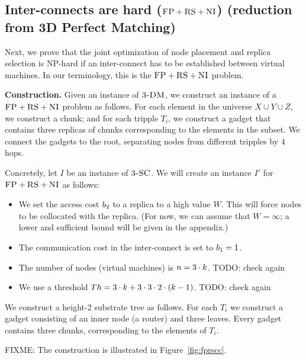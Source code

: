 \subsection{Inter-connects are hard ($\textsc{FP}+\textsc{RS}+\textsc{NI}$) (reduction from 3D Perfect Matching)}\label{ssec:fprscc}


Next, we prove that the joint optimization of node placement and replica selection
is NP-hard if an inter-connect has to be established between virtual machines.
In our terminology, this is the $\textsc{FP}+\textsc{RS}+\textsc{NI}$ problem.


\textbf{Construction.}
Given an instance of $\textsc{3-DM}$, we construct an instance of a
$\textsc{FP}+\textsc{RS}+\textsc{NI}$ problem as follows. For each element
in the universe $X \cup Y \cup Z$, we construct a chunk; and for each
tripple $T_i$, we construct a gadget that contains
three replicas of chunks corresponding to the elements in the subset.
We connect the gadgets to the root, separating nodes from different tripples by 4 hops.

Concretely, let $I$ be an instance of $\textsc{3-SC}$. We will create an instance $I'$
for $\textsc{FP}+\textsc{RS}+\textsc{NI}$ as follows:
\begin{itemize}
\item We set the access cost $b_2$ to a replica to a high value $W$. This will force
nodes to be collocated with the replica.
(For now, we can assume that $W=\infty$; a lower and sufficient bound will be given
in the appendix.)
\item The communication cost in the inter-connect is set to $b_1 = 1$.
\item The number of nodes (virtual machines) is $n = 3 \cdot k$. TODO: check again
\item We use a threshold $Th =  3 \cdot k + 3 \cdot 3 \cdot 2 \cdot (k - 1)$. TODO: check again
\end{itemize}

We construct a height-2 substrate tree
as follows. For each $T_i$ we construct a gadget
consisting of an inner node (a router) and three leaves. Every gadget
contains three chunks, corresponding to the elements of $T_i$.

FIXME: The construction is illustrated in Figure~\ref{fig:fprscc}.

